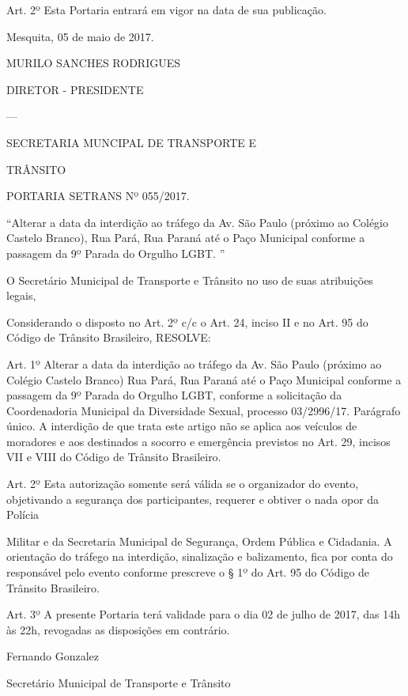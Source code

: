 \documentclass{doliberto}
\begin{document}
Art.  2º  Esta  Portaria  entrará  em  vigor  na  data  de  sua 
publicação.  

Mesquita, 05 de maio de 2017. 
 
 
MURILO SANCHES RODRIGUES 

DIRETOR - PRESIDENTE 

---

SECRETARIA MUNCIPAL DE TRANSPORTE E 

TRÂNSITO 

 

PORTARIA SETRANS Nº 055/2017. 

“Alterar  a  data  da  interdição  ao  tráfego  da  Av.  São  Paulo 
(próximo ao Colégio Castelo Branco), Rua Pará, Rua Paraná 
até o Paço Municipal conforme a passagem da 9º Parada do 
Orgulho LGBT. ” 
 
O Secretário Municipal de Transporte e Trânsito no uso 
de suas atribuições legais,  
 
Considerando o disposto no Art. 2º c/c o Art. 24, inciso II e 
no Art. 95 do Código de Trânsito Brasileiro,  
RESOLVE:  
 
Art.  1º  Alterar  a  data  da  interdição  ao  tráfego  da  Av.  São 
Paulo  (próximo  ao  Colégio  Castelo  Branco)  Rua  Pará,  Rua 
Paraná  até  o  Paço  Municipal  conforme  a  passagem  da  9º 
Parada  do  Orgulho  LGBT,  conforme  a  solicitação  da 
Coordenadoria  Municipal  da  Diversidade  Sexual,  processo 
03/2996/17. 
Parágrafo único. A interdição de que trata este artigo não se 
aplica aos veículos de moradores e aos destinados a socorro 
e  emergência  previstos  no  Art.  29,  incisos  VII  e  VIII  do 
Código de Trânsito Brasileiro.  
 
Art.  2º  Esta  autorização  somente  será  válida  se  o 
organizador  do  evento,  objetivando  a  segurança  dos 
participantes, requerer e obtiver o nada opor da Polícia 
 

Militar e da Secretaria Municipal de Segurança, Ordem 
Pública  e  Cidadania. 
  A  orientação  do  tráfego  na 
interdição, sinalização e balizamento, fica por conta do 
responsável pelo evento conforme prescreve  o §  1º  do 
Art. 95 do Código de Trânsito Brasileiro.  
 
Art.  3º  A  presente  Portaria  terá  validade  para  o  dia  02  de 
julho de 2017, das 14h às 22h, revogadas as disposições em 
contrário. 
 

Fernando Gonzalez  

Secretário Municipal de Transporte e Trânsito 
\end{document}
